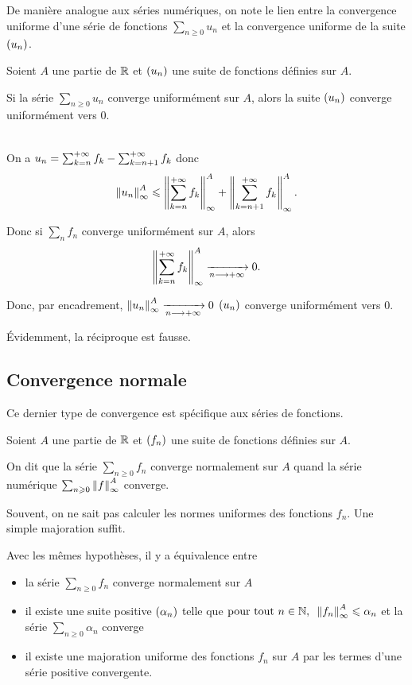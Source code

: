 De manière analogue aux séries numériques, on note le lien entre la convergence uniforme d'une série de fonctions \(\sum_{n\geq0}u_n\) et la convergence uniforme de la suite \(\left(u_n\right)\).

\begin{prop}
Soient \(A\) une partie de \(\mathbb{R}\) et \(\left(u_n\right)\) une suite de fonctions définies sur \(A\).

Si la série \(\sum_{n\geq0}u_n\) converge uniformément sur \(A\), alors la suite \(\left(u_n\right)\) converge uniformément vers \(0\).
\end{prop}

\begin{dem}~\\
On a \(u_n=\sum_{k=n}^{+\infty}f_k-\sum_{k=n+1}^{+\infty}f_k\) donc \[\norme{u_n}_\infty^A\leq\norme{\sum_{k=n}^{\pinf}f_k}_\infty^A+\norme{\sum_{k=n+1}^{\pinf}f_k}_\infty^A.\]

Donc si \(\sum_nf_n\) converge uniformément sur \(A\), alors \[\norme{\sum_{k=n}^{\pinf}f_k}_\infty^A\tendqd{n\to\pinf}0.\]

Donc, par encadrement, \(\norme{u_n}_\infty^A\tendqd{n\to\pinf}0\) \ie \(\left(u_n\right)\) converge uniformément vers \(0\).
\end{dem}

Évidemment, la réciproque est fausse.

\subsection{Convergence normale}

Ce dernier type de convergence est spécifique aux séries de fonctions.

\begin{defi}
Soient \(A\) une partie de \(\mathbb{R}\) et \(\left(f_n\right)\) une suite de fonctions définies sur \(A\).

On dit que la série \(\sum_{n\geq0}f_n\) converge normalement sur \(A\) quand la série numérique \(\sum_{n\geq0}\norme{f}_\infty^A\) converge.
\end{defi}

Souvent, on ne sait pas calculer les normes uniformes des fonctions \(f_n\). Une simple majoration suffit.

\begin{prop}
Avec les mêmes hypothèses, il y a équivalence entre

\begin{itemize}
    \item la série \(\sum_{n\geq0}f_n\) converge normalement sur \(A\) \\
    \item il existe une suite positive \(\left(\alpha_n\right)\) telle que \(\quantifs{\tpt n\in\N}\norme{f_n}_\infty^A\leq\alpha_n\) et la série \(\sum_{n\geq0}\alpha_n\) converge \\
    \item il existe une majoration uniforme des fonctions \(f_n\) sur \(A\) par les termes d'une série positive convergente.
\end{itemize}
\end{prop}

